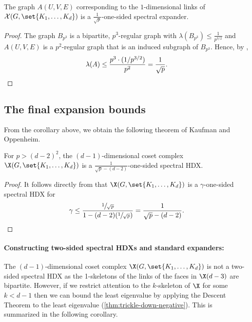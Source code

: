 \documentclass{toc}
\begin{document}
\begin{corollary}
  The graph $A(U,V,E)$ corresponding to the $1$-dimensional links of $\mathcal{X}(G,\set{K_1,\ldots, K_d})$ is a $\frac{1}{\sqrt{p}}$-one-sided spectral expander. 
\end{corollary}
\begin{proof}
  The graph $B_{p^3}$ is a bipartite, $p^3$-regular graph with $\lambda(B_{p^3}) \leq \frac{1}{p^{3/2}}$ and $A(U,V,E)$ is a $p^2$-regular graph that is an induced subgraph of $B_{p^3}$. Hence, by ,
  \[
\lambda(A) \leq \frac{p^3 \cdot (1/p^{3/2})}{p^2} = \frac{1}{\sqrt{p}}. \qedhere
  \]
\end{proof}

\subsection*{The final expansion bounds}

From the corollary above, we obtain the following theorem of Kaufman and 
Oppenheim.

\begin{theorem}\label{thm:KO-HDX} For $p > (d-2)^2$, 
  the $(d-1)$-dimensional coset complex $\X(G,\set{K_1,\ldots,K_d})$
  is a $\frac1{\sqrt{p}-(d-2)}$-one-sided spectral HDX.
\end{theorem}

\begin{proof}
%
It follows  %
directly from  that
  $\X(G,\set{K_1,\ldots,K_d})$ is a $\gamma$-one-sided spectral HDX for
  \[
  \gamma \leq \frac{\sfrac{1}{\sqrt{p}}}{1 - (d-2)(\sfrac{1}{\sqrt{p}})} = \frac{1}{\sqrt{p} - (d-2)}.\qedhere
  \]
\end{proof}

\paragraph{Constructing two-sided spectral HDXs and standard expanders:}

The $(d-1)$-dimensional coset complex $\X(G,\set{K_1,\ldots,K_d})$ is
not a two-sided spectral HDX as the 1-skeletons of the links of the faces in
$\X(d-3)$ are bipartite. However, if we restrict attention to the $k$-skeleton of
$\X$ for some $k<d-1$ then we can bound the least eigenvalue
%
by applying the Descent Theorem to the least eigenvalue %
(\eqref{thm:trickle-down-negative}).
This is summarized in the following corollary. 
\end{document}
